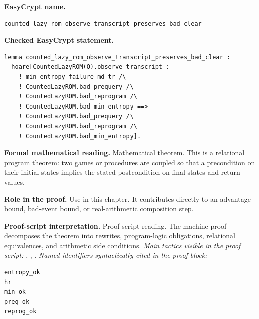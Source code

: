 \begin{formaltheorem}
\noindent\textbf{EasyCrypt name.}
\begin{lstlisting}[language=EasyCrypt,basicstyle=\ttfamily\scriptsize]
counted_lazy_rom_observe_transcript_preserves_bad_clear
\end{lstlisting}
\noindent\textbf{Checked EasyCrypt statement.}
\begin{lstlisting}[language=EasyCrypt,basicstyle=\ttfamily\scriptsize]
lemma counted_lazy_rom_observe_transcript_preserves_bad_clear :
  hoare[CountedLazyROM(O).observe_transcript :
    ! min_entropy_failure md tr /\
    ! CountedLazyROM.bad_prequery /\
    ! CountedLazyROM.bad_reprogram /\
    ! CountedLazyROM.bad_min_entropy ==>
    ! CountedLazyROM.bad_prequery /\
    ! CountedLazyROM.bad_reprogram /\
    ! CountedLazyROM.bad_min_entropy].
\end{lstlisting}
\noindent\textbf{Formal mathematical reading.}
Mathematical theorem. This is a relational program theorem: two games or procedures are coupled so that a precondition on their initial states implies the stated postcondition on final states and return values.

\noindent\textbf{Role in the proof.}
Use in this chapter. It contributes directly to an advantage bound, bad-event bound, or real-arithmetic composition step.

\noindent\textbf{Proof-script interpretation.}
Proof-script reading. The machine proof decomposes the theorem into rewrites, program-logic obligations, relational equivalences, and arithmetic side conditions.
\emph{Main tactics visible in the proof script:} , , .
\emph{Named identifiers syntactically cited in the proof block:}
\begin{lstlisting}[language=EasyCrypt,basicstyle=\ttfamily\scriptsize]
entropy_ok
hr
min_ok
preq_ok
reprog_ok
\end{lstlisting}

\end{formaltheorem}

